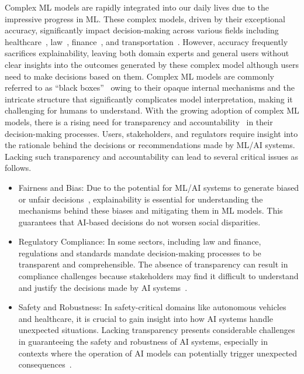 Complex ML models are rapidly integrated 
into our daily lives due to the impressive progress in ML.
%
These complex models, driven by their exceptional accuracy, significantly impact decision-making 
across various fields including healthcare~\cite{aimed-jbhi20,mpr-jfmpc19,rcbt-nm22,racc-jamia20,xaihealth-access22},
 law~\cite{raai-sp19,ksarv-mecon22}, finance~\cite{aifin20,gklp-jbef21,af-fintech19}, and
transportation~\cite{adlb-sust19,nmnk-sust20,hy-rits20}.
%
However, accuracy frequently sacrifices explainability, 
leaving both domain experts and general users without clear insights into the outcomes generated 
by these complex model although users need to make decisions based on them.
%
Complex ML models are commonly referred to as ``black boxes''~\cite{lg-access19,yyx-if22,ya-lim19,carab-ais20}
owing to their opaque internal mechanisms and 
the intricate structure that significantly complicates model interpretation,
making it challenging for humans to understand.
%
With the growing adoption of complex ML models, there is a rising need for
transparency and accountability~\cite{rai-jams20,vw-pt21,lh-ipr20,trai-nature20} 
in their decision-making processes.
%
Users, stakeholders, and regulators require insight into the
rationale behind the decisions or recommendations made by ML/AI systems.
%
Lacking such transparency and accountability can lead to several critical issues
as follows.

\begin{itemize}
	\item Fairness and Bias: 
		Due to the potential for ML/AI systems to generate biased or unfair 
		decisions~\cite{propublica16,hhll-corr22}, explainability is essential for understanding the
		mechanisms behind these biases and mitigating them in ML models. 
		This guarantees that AI-based decisions do not worsen social disparities.
	\item Regulatory Compliance:
		In some sectors, including law and finance, regulations and standards mandate 
		decision-making processes to be transparent and comprehensible.
		The absence of transparency can result in compliance challenges because stakeholders 
		may find it difficult to understand and justify the decisions made by AI 
		systems~\cite{jiv-nmi19,sbbl-aes20,coeck-mitp20}.
	\item Safety and Robustness:
		In safety-critical domains like autonomous vehicles and healthcare, 
		it is crucial to gain insight into how AI systems handle unexpected situations.
		Lacking transparency presents considerable challenges in guaranteeing the safety and
		robustness of AI systems, especially in contexts where the operation of AI models 
		can potentially trigger unexpected consequences~\cite{dear-alr19}.
\end{itemize}

